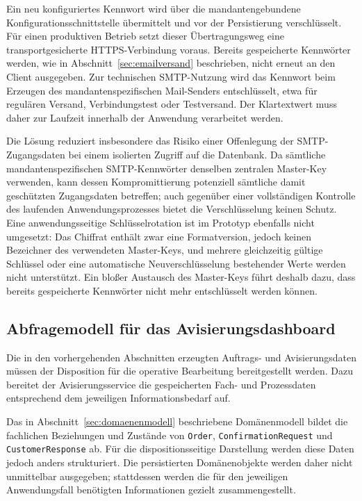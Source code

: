 \documentclass[
  12pt,
  a4paper,
  oneside
]{article}
\begin{document}
Ein neu konfiguriertes Kennwort wird über die mandantengebundene
Konfigurationsschnittstelle übermittelt und vor der Persistierung
verschlüsselt. Für einen produktiven Betrieb setzt dieser Übertragungsweg eine
transportgesicherte HTTPS-Verbindung voraus. Bereits gespeicherte Kennwörter
werden, wie in Abschnitt~\ref{sec:emailversand} beschrieben, nicht erneut an
den Client ausgegeben. Zur technischen SMTP-Nutzung wird das Kennwort beim
Erzeugen des mandantenspezifischen Mail-Senders entschlüsselt, etwa für
regulären Versand, Verbindungstest oder Testversand. Der Klartextwert muss
daher zur Laufzeit innerhalb der Anwendung verarbeitet werden.

Die Lösung reduziert insbesondere das Risiko einer Offenlegung der
SMTP-Zugangsdaten bei einem isolierten Zugriff auf die Datenbank. Da sämtliche
mandantenspezifischen SMTP-Kennwörter denselben zentralen Master-Key verwenden,
kann dessen Kompromittierung potenziell sämtliche damit geschützten
Zugangsdaten betreffen; auch gegenüber einer vollständigen Kontrolle des
laufenden Anwendungsprozesses bietet die Verschlüsselung keinen Schutz. Eine
anwendungsseitige Schlüsselrotation ist im Prototyp ebenfalls nicht umgesetzt:
Das Chiffrat enthält zwar eine Formatversion, jedoch keinen Bezeichner des
verwendeten Master-Keys, und mehrere gleichzeitig gültige Schlüssel oder eine
automatische Neuverschlüsselung bestehender Werte werden nicht unterstützt.
Ein bloßer Austausch des Master-Keys führt deshalb dazu, dass bereits
gespeicherte Kennwörter nicht mehr entschlüsselt werden können.

\subsection{Abfragemodell für das Avisierungsdashboard}
\label{sec:abfragemodell}

Die in den vorhergehenden Abschnitten erzeugten Auftrags- und
Avisierungsdaten müssen der Disposition für die operative Bearbeitung
bereitgestellt werden. Dazu bereitet der Avisierungsservice die gespeicherten
Fach- und Prozessdaten entsprechend dem jeweiligen Informationsbedarf auf.

Das in Abschnitt~\ref{sec:domaenenmodell} beschriebene
Domänenmodell bildet die fachlichen Beziehungen und Zustände von
\texttt{Order}, \texttt{ConfirmationRequest} und \texttt{CustomerResponse}
ab. Für die dispositionsseitige Darstellung werden diese Daten jedoch anders
strukturiert. Die persistierten Domänenobjekte werden daher nicht unmittelbar
ausgegeben; stattdessen werden die für den jeweiligen Anwendungsfall
benötigten Informationen gezielt zusammengestellt.
\end{document}
